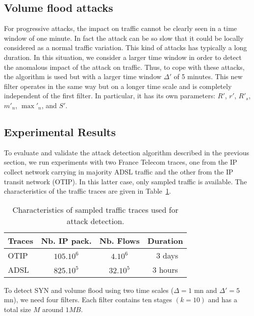 \documentclass{amsart}
\begin{document}
\subsection{Volume flood attacks}

For  progressive attacks, the impact on  traffic cannot be clearly seen in
a time window of one minute. In fact the attack can be so slow that it could be  locally considered
as a normal traffic variation. This kind of attacks has typically a long duration. In this
situation, we  consider a larger time window in order to detect the anomalous impact of the
attack on  traffic. Thus,  to cope with these attacks, the algorithm
is used but with  a larger time window $\Delta'$ of 5 minutes. This new filter operates
in the same way but on a longer time scale and is completely independent of the first
filter. In particular, it  has its own parameters: $R'$, $r'$, $R'_s$, $m'_n$, $\max'_n$, and  $S'$. 

\subsection{Experimental Results}
To evaluate and validate the attack detection algorithm described in the previous section,  we run experiments with  two
France Telecom traces, one from the IP collect network carrying in majority ADSL traffic and the other from the IP transit network (OTIP). In this latter case, only
sampled traffic is available. The characteristics of the traffic traces are given in Table~\ref{charac}.   

\begin{table}[hbtp]
			\begin{center}
			\begin{tabular}{lccc}
			\hline
			Traces	 &  Nb. IP pack. &  Nb. Flows& Duration\\
			\hline
			OTIP	&$105.10^6$	&$4.10^6$	&~3 days\\
			ADSL &$825.10^5$	&$32.10^5$ 	&3 hours\\
				
			\hline
			\end{tabular}
			\end{center}
			\caption{Characteristics of sampled traffic  traces used for attack detection. \label{charac}}
\end{table}



To detect SYN and volume flood using two time scales ($\Delta=1$ mn and $\Delta'=5$ mn), we need
four filters. Each filter contains ten stages $(k=10)$ and has a total size $M$ around
$1MB$. 
\end{document}
